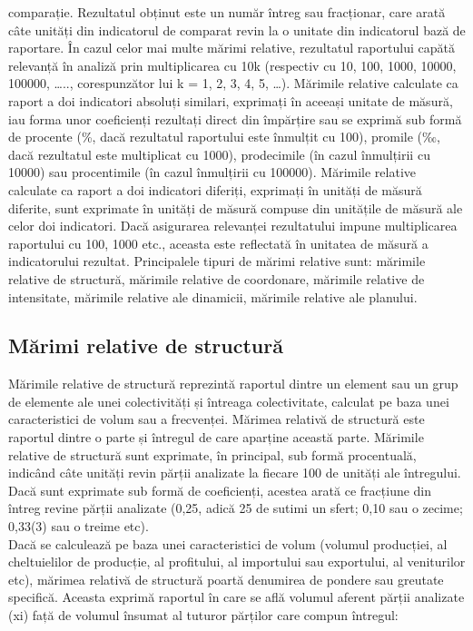 \documentclass[
  11pt,
  b5paper,
  nottoc]{book}
\begin{document}
comparație. Rezultatul obținut este un număr întreg sau fracționar, care
arată câte unități din indicatorul de comparat revin la o unitate din
indicatorul bază de raportare. În cazul celor mai multe mărimi relative,
rezultatul raportului capătă relevanță în analiză prin multiplicarea cu
10k (respectiv cu 10, 100, 1000, 10000, 100000, \ldots.., corespunzător
lui k = 1, 2, 3, 4, 5, \ldots). Mărimile relative calculate ca raport a
doi indicatori absoluți similari, exprimați în aceeași unitate de
măsură, iau forma unor coeficienți rezultați direct din împărțire sau se
exprimă sub formă de procente (\%, dacă rezultatul raportului este
înmulțit cu 100), promile (‰, dacă rezultatul este multiplicat cu 1000),
prodecimile (în cazul înmulțirii cu 10000) sau procentimile (în cazul
înmulțirii cu 100000). Mărimile relative calculate ca raport a doi
indicatori diferiți, exprimați în unități de măsură diferite, sunt
exprimate în unități de măsură compuse din unitățile de măsură ale celor
doi indicatori. Dacă asigurarea relevanței rezultatului impune
multiplicarea raportului cu 100, 1000 etc., aceasta este reflectată în
unitatea de măsură a indicatorului rezultat. Principalele tipuri de
mărimi relative sunt: mărimile relative de structură, mărimile relative
de coordonare, mărimile relative de intensitate, mărimile relative ale
dinamicii, mărimile relative ale planului.

\hypertarget{mux103rimi-relative-de-structurux103}{%
\subsection{Mărimi relative de
structură}\label{mux103rimi-relative-de-structurux103}}

Mărimile relative de structură reprezintă raportul dintre un element sau
un grup de elemente ale unei colectivități și întreaga colectivitate,
calculat pe baza unei caracteristici de volum sau a frecvenței. Mărimea
relativă de structură este raportul dintre o parte și întregul de care
aparține această parte. Mărimile relative de structură sunt exprimate,
în principal, sub formă procentuală, indicând câte unități revin părții
analizate la fiecare 100 de unități ale întregului. Dacă sunt exprimate
sub formă de coeficienți, acestea arată ce fracțiune din întreg revine
părții analizate (0,25, adică 25 de sutimi un sfert; 0,10 sau o zecime;
0,33(3) sau o treime etc).\\
Dacă se calculează pe baza unei caracteristici de volum (volumul
producției, al cheltuielilor de producție, al profitului, al importului
sau exportului, al veniturilor etc), mărimea relativă de structură
poartă denumirea de pondere sau greutate specifică. Aceasta exprimă
raportul în care se află volumul aferent părții analizate (xi) față de
volumul însumat al tuturor părților care compun întregul:
\end{document}
